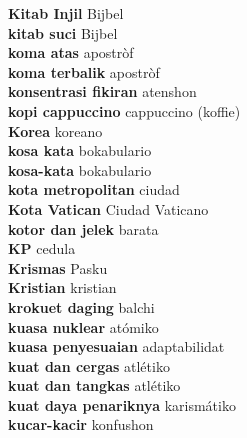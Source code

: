 \textbf{ Kitab Injil  } Bijbel \\
\textbf{ kitab suci  } Bijbel \\
\textbf{ koma atas  } apostròf \\
\textbf{ koma terbalik  } apostròf \\
\textbf{ konsentrasi fikiran  } atenshon \\
\textbf{ kopi cappuccino  } cappuccino (koffie) \\
\textbf{ Korea  } koreano \\
\textbf{ kosa kata  } bokabulario \\
\textbf{ kosa-kata  } bokabulario \\
\textbf{ kota metropolitan  } ciudad \\
\textbf{ Kota Vatican  } Ciudad Vaticano \\
\textbf{ kotor dan jelek  } barata \\
\textbf{ KP  } cedula \\
\textbf{ Krismas  } Pasku \\
\textbf{ Kristian  } kristian \\
\textbf{ krokuet daging  } balchi \\
\textbf{ kuasa nuklear  } atómiko \\
\textbf{ kuasa penyesuaian  } adaptabilidat \\
\textbf{ kuat dan cergas  } atlétiko \\
\textbf{ kuat dan tangkas  } atlétiko \\
\textbf{ kuat daya penariknya  } karismátiko \\
\textbf{ kucar-kacir  } konfushon \\
